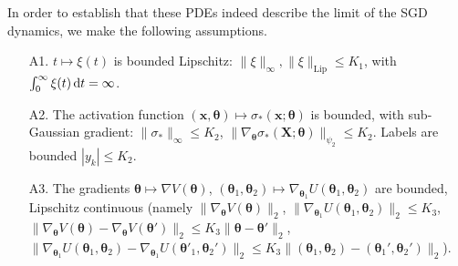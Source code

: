 \documentclass{article}
\begin{document}
In order to establish that these PDEs indeed describe the limit of the SGD dynamics, we make the following assumptions.
%
\begin{itemize}\label{list: reg assumptions}
%
	\item[{\sf A1.}] $t\mapsto \xi(t)$ is bounded Lipschitz: $\|\xi\|_{\infty}, \|\xi\|_{\text{Lip}}\leq K_1$, with $\int_0^{\infty}\xi(t) \operatorname{d}\!  t=\infty$.
%
\item[{\sf A2.}] The activation function $( \mathbf{x}, \mathbf{\theta})\mapsto \sigma_*( \mathbf{x}; \mathbf{ \theta})$ is bounded, with sub-Gaussian gradient: $\|\sigma_*\|_{\infty}\leq  K_2$, $\|\nabla_{ \mathbf{ \theta}}
\sigma_*( \mathbf{X}; \mathbf{\theta})\|_{\psi_2}\leq K_2$. Labels are bounded $|y_k|\leq K_2$.
%
\item[{\sf A3.}] The gradients $\mathbf{\theta}\mapsto \nabla V( \mathbf{\theta})$, $(\mathbf{\theta}_1,\mathbf{\theta}_2)\mapsto \nabla_{\mathbf{\theta}_1}U(\mathbf{\theta}_1,\mathbf{\theta}_2)$  are bounded, Lipschitz continuous 
(namely $\| \nabla_{\mathbf{\theta}}V(\mathbf{\theta}) \|_2$, $\|\nabla_{\mathbf{\theta}_1}U(\mathbf{\theta}_1,\mathbf{\theta}_2)\|_2\leq K_3$, $\|\nabla_{\mathbf{\theta}}V(\mathbf{\theta})-\nabla_{\mathbf{\theta}}V(\mathbf{\theta}')\|_2\leq K_3 \|\mathbf{\theta}-\mathbf{\theta}'\|_2$, $\|\nabla_{\mathbf{\theta}_1}U(\mathbf{\theta}_1,\mathbf{\theta}_2)-\nabla_{\mathbf{\theta}_1}U(\mathbf{\theta}'_1,\mathbf{\theta}_2')\|_2\leq K_3 \|(\mathbf{\theta}_1,\mathbf{\theta}_2)-
(\mathbf{\theta}_1',\mathbf{\theta}_2')\|_2$).
%
\end{itemize}
\end{document}
